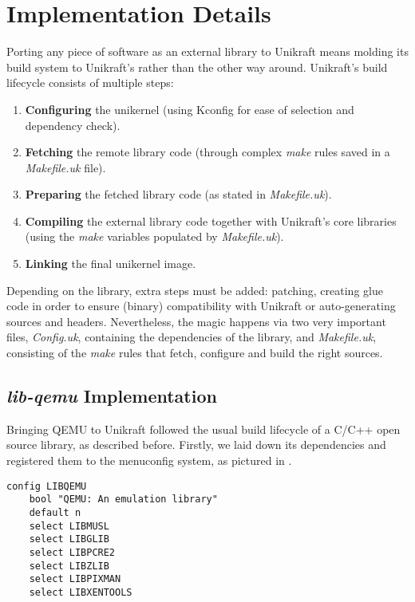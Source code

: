 \chapter{Implementation Details}
\label{chapter:implementation-details}

Porting any piece of software as an external library to Unikraft means molding its build system to Unikraft's rather than the other way around.
Unikraft's build lifecycle consists of multiple steps:

\begin{enumerate}
    \item \textbf{Configuring} the unikernel (using Kconfig \cite{kconfig} for ease of selection and dependency check).
    \item \textbf{Fetching} the remote library code (through complex \textit{make} rules saved in a \textit{Makefile.uk} file).
    \item \textbf{Preparing} the fetched library code (as stated in \textit{Makefile.uk}).
    \item \textbf{Compiling} the external library code together with Unikraft's core libraries (using the \textit{make} variables populated by \textit{Makefile.uk}).
    \item \textbf{Linking} the final unikernel image.
  \end{enumerate}

Depending on the library, extra steps must be added: patching, creating glue code in order to ensure (binary) compatibility with Unikraft or auto-generating sources and headers.
Nevertheless, the magic happens via two very important files, \textit{Config.uk}, containing the dependencies of the library, and \textit{Makefile.uk}, consisting of the \textit{make} rules that fetch, configure and build the right sources.

\section{\textit{lib-qemu} Implementation}
\label{sec:impl-lib-qemu}

Bringing QEMU to Unikraft followed the usual build lifecycle of a C/C++ open source library, as described before.
Firstly, we laid down its dependencies and registered them to the menuconfig system, as pictured in .

\begin{lstlisting}
config LIBQEMU
    bool "QEMU: An emulation library"
    default n
    select LIBMUSL
    select LIBGLIB
    select LIBPCRE2
    select LIBZLIB
    select LIBPIXMAN
    select LIBXENTOOLS
\end{lstlisting}

